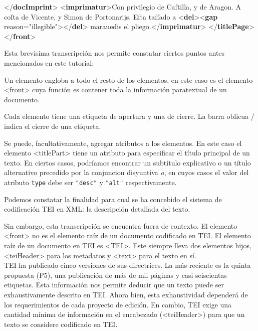 \documentclass[
]{book}
\newenvironment{Shaded}{\begin{snugshade}}{\end{snugshade}}
\newcommand{\KeywordTok}[1]{\textcolor[rgb]{0.13,0.29,0.53}{\textbf{#1}}}
\newcommand{\NormalTok}[1]{#1}
\newcommand{\OtherTok}[1]{\textcolor[rgb]{0.56,0.35,0.01}{#1}}
\newcommand{\StringTok}[1]{\textcolor[rgb]{0.31,0.60,0.02}{#1}}
\begin{document}
\begin{Shaded}
\begin{Highlighting}[]
\NormalTok{    \textless{}/}\KeywordTok{docImprint}\NormalTok{\textgreater{}}
\NormalTok{    \textless{}}\KeywordTok{imprimatur}\NormalTok{\textgreater{}Con privilegio de Caſtilla, y de Aragon. A coſta de Vicente, y Simon de Portonarijs. Eſta taſſado a        \textless{}}\KeywordTok{del}\NormalTok{\textgreater{}\textless{}}\KeywordTok{gap}\OtherTok{ reason=}\StringTok{"illegible"}\NormalTok{\textgreater{}\textless{}/}\KeywordTok{del}\NormalTok{\textgreater{} }
\NormalTok{    marauedis el pliego.\textless{}/}\KeywordTok{imprimatur}\NormalTok{\textgreater{}}
\NormalTok{  \textless{}/}\KeywordTok{titlePage}\NormalTok{\textgreater{}}
\NormalTok{\textless{}/}\KeywordTok{front}\NormalTok{\textgreater{}}
\end{Highlighting}
\end{Shaded}

Esta brevísima transcripción nos permite constatar ciertos puntos antes mencionados en este tutorial:

Un elemento engloba a todo el resto de los elementos, en este caso es el elemento { \textless front\textgreater{} } cuya función es contener toda la información paratextual de un documento.

Cada elemento tiene una etiqueta de apertura y una de cierre. La barra oblicua / indica el cierre de una etiqueta.

Se puede, facultativamente, agregar atributos a los elementos. En este caso el elemento { \textless titlePart\textgreater{} } tiene un atributo para especificar el título principal de un texto. En ciertos casos, podríamos encontrar un subtítulo explicativo o un título alternativo precedido por la conjuncion disyuntiva \emph{o}, en cuyos casos el valor del atributo \texttt{type} debe ser \texttt{"desc"} y \texttt{"alt"} respectivamente.

Podemos constatar la finalidad para cual se ha concebido el sistema de codificación TEI en XML: la descripción detallada del texto.

Sin embargo, esta transcripción se encuentra fuera de contexto. El elemento { \textless front\textgreater{} } no es el elemento raíz de un documento codificado en TEI.
El elemento raíz de un documento en TEI es { \textless TEI\textgreater{}}. Este siempre lleva dos elementos hijos, { \textless teiHeader\textgreater{} }para los metadatos y { \textless text\textgreater{} } para el texto en sí.\\
TEI ha publicado cinco versiones de sus directrices. La más reciente es la quinta propuesta (P5), una publicación de más de mil páginas y casi seiscientas etiquetas. Esta información nos permite deducir que un texto puede ser exhaustivamente descrito en TEI. Ahora bien, esta exhaustividad dependerá de los requerimientos de cada proyecto de edición. En cambio, TEI exige una cantidad mínima de información en el encabezado ({\textless teiHeader\textgreater{}}) para que un texto se considere codificado en TEI.
\end{document}
